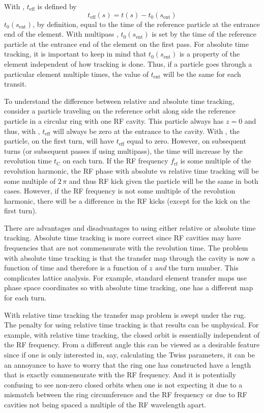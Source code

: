 With , $t_\text{eff}$ is defined by
\begin{equation}
  t_\text{eff}(s) = t(s) - t_0(s_\text{ent})
\end{equation}
$t_0(s_\text{ent})$, by definition, equal to the time of the reference particle at the entrance end
of the element. With multipass , $t_0(s_\text{ent})$ is set by the time of the
reference particle at the entrance end of the element on the first pass. For absolute time tracking,
it is important to keep in mind that $t_0(s_\text{ent})$ is a property of the element independent of
how tracking is done. Thus, if a particle goes through a particular element multiple times, the
value of $t_\text{ent}$ will be the same for each transit.

To understand the difference between relative and absolute time tracking, consider a particle
traveling on the reference orbit along side the reference particle in a circular ring with one RF
cavity. This particle always has $z = 0$ and thus, with , $t_\text{eff}$
will always be zero at the entrance to the cavity.  With , the particle,
on the first turn, will have $t_\text{eff}$ equal to zero. However, on subsequent turns (or
subsequent passes if using multipass), the time will increase by the revolution time $t_\text{C}$ on
each turn. If the RF frequency $f_\text{rf}$ is some multiple of the revolution harmonic, the RF
phase with absolute vs relative time tracking will be some multiple of $2 \, \pi$ and thus RF kick
given the particle will be the same in both cases. However, if the RF frequency is not some multiple
of the revolution harmonic, there will be a difference in the RF kicks (except for the kick on the
first turn).

There are advantages and disadvantages to using either relative or absolute time tracking. Absolute
time tracking is more correct since RF cavities may have frequencies that are not commensurate with
the revolution time. The problem with absolute time tracking is that the transfer map through the
cavity is now a function of time and therefore is a function of $z$ {\em and} the turn number. This
complicates lattice analysis. For example, standard element transfer maps use phase space
coordinates so with absolute time tracking, one has a different map for each turn.

With relative time tracking the transfer map problem is swept under the rug. The penalty for using
relative time tracking is that results can be unphysical. For example, with relative time tracking,
the closed orbit is essentially independent of the RF frequency. From a different angle this can be
viewed as a desirable feature since if one is only interested in, say, calculating the Twiss
parameters, it can be an annoyance to have to worry that the ring one has constructed have a length
that is exactly commensurate with the RF frequency. And it is potentially confusing to see non-zero
closed orbits when one is not expecting it due to a mismatch between the ring circumference and the
RF frequency or due to RF cavities not being spaced a multiple of the RF wavelength apart.

